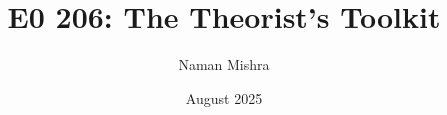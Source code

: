 \documentclass[12pt]{report}
\title{E0 206: The Theorist's Toolkit}
\author{Naman Mishra}
\date{August 2025}
\begin{document}
\maketitle
\tableofcontents
\listoflecture
    
    
    
\end{document}
